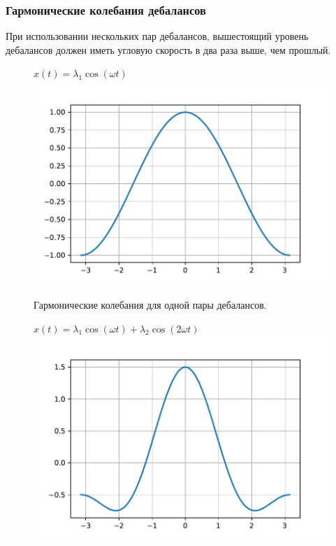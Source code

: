 \documentclass[10pt, pdf, hyperref={unicode}]{beamer}
\begin{document}
    \begin{frame}
        \frametitle{Гармонические колебания дебалансов}
        \begin{center}
            \begin{minipage}[h]{0.97\linewidth}
                При использовании нескольких пар дебалансов, вышестоящий уровень дебалансов должен иметь угловую скорость в два раза выше, чем прошлый.\\
                \newline
                \begin{minipage}[h]{0.44\linewidth}
                    \begin{figure}[h]
                        \centering
                        $x(t) = \lambda_1 \cos (\omega t)$
                        \includegraphics[width=1\linewidth]{../grap/impulse_1.pdf}
                        \caption{Гармонические колебания для одной пары дебалансов.}
                    \end{figure}
                \end{minipage}
                \hfill
                \begin{minipage}[h]{0.44\linewidth}
                    \begin{figure}[h]
                        \centering
                        $x(t) = \lambda_1 \cos (\omega t) + \lambda_2 \cos (2\omega t)$
                        \includegraphics[width=1\linewidth]{../grap/impulse_2.pdf}

\end{figure}
\end{minipage}
\end{minipage}
\end{center}
\end{frame}
\end{document}
